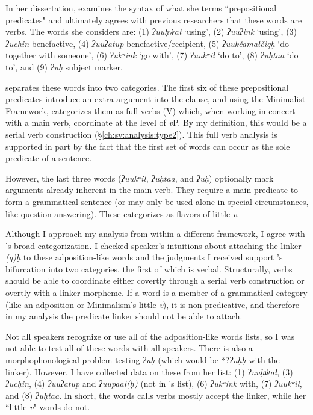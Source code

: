 In her dissertation, \citet{woo2007b} examines the syntax of what she terms ``prepositional predicates" and ultimately agrees with previous researchers that these words are verbs. The words she considers are: (1) \textit{ʔuuḥw̓ał} `using', (2) \textit{ʔuuʔink} `using', (3) \textit{ʔucḥin} benefactive, (4) \textit{ʔuuʔatup} benefactive/recipient, (5) \textit{ʔuukčamałčiqḥ} `do together with someone', (6) \textit{ʔukʷink} `go with', (7) \textit{ʔuukʷił} `do to', (8) \textit{ʔuḥtaa} `do to', and (9) \textit{ʔuḥ} subject marker.

\citeauthor{woo2007b} separates these words into two categories. The first six of these prepositional predicates introduce an extra argument into the clause, and using the Minimalist Framework, \citeauthor{woo2007b} categorizes them as full verbs (V) which, when working in concert with a main verb, coordinate at the level of \textit{v}P. By my definition, this would be a serial verb construction (\S\ref{ch:sv:analysis:type2}). This full verb analysis is supported in part by the fact that the first set of words can occur as the sole predicate of a sentence.

However, the  last three words (\textit{ʔuukʷił}, \textit{ʔuḥtaa}, and \textit{ʔuḥ}) optionally mark arguments already inherent in the main verb. They require a main predicate to form a grammatical sentence (or may only be used alone in special circumstances, like question-answering). These \citeauthor{woo2007b} categorizes as flavors of little-\textit{v}.

Although I approach my analysis from within a different framework, I agree with \citeauthor{woo2007b}'s broad categorization. I checked speaker's intuitions about attaching the linker \textit{-(q)ḥ} to these adposition-like words and the judgments I received support \citeauthor{woo2007b}'s bifurcation into two categories, the first of which is verbal. Structurally, verbs should be able to coordinate either covertly through a serial verb construction or overtly with a linker morpheme. If a word is a member of a grammatical category (like an adposition or Minimalism's little-\textit{v}), it is non-predicative, and therefore in my analysis the predicate linker should not be able to attach.

Not all speakers recognize or use all of the adposition-like words \citeauthor{woo2007b} lists, so I was not able to test all of these words with all speakers. There is also a morphophonological problem testing \textit{ʔuḥ} (which would be *?\textit{ʔuḥḥ} with the linker). However, I have collected data on these from her list: (1) \textit{ʔuuḥw̓ał}, (3) \textit{ʔucḥin}, (4) \textit{ʔuuʔatup} and \textit{ʔuupaał(ḥ)} (not in \citeauthor{woo2007b}'s list), (6) \textit{ʔukʷink} with, (7) \textit{ʔuukʷił}, and (8) \textit{ʔuḥtaa}. In short, the words \citeauthor{woo2007b} calls verbs mostly accept the linker, while her ``little-\textit{v}" words do not.

